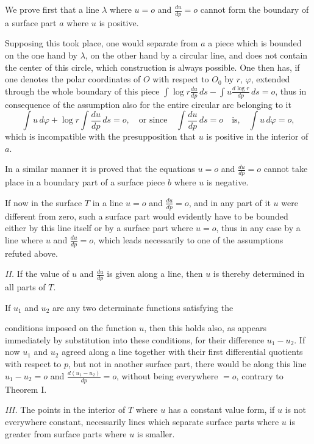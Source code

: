 \documentclass{article}
\begin{document}
We prove first that a line $\lambda$ where $u = o$ and $\frac{du}{dp} = o$ cannot form the boundary of a surface part $a$ where $u$ is positive.

Supposing this took place, one would separate from $a$ a piece which is bounded on the one hand by $\lambda$, on the other hand by a circular line, and does not contain the center of this circle, which construction is always possible. One then has, if one denotes the polar coordinates of $O$ with respect to $O_0$ by $r$, $\varphi$, extended through the whole boundary of this piece $\displaystyle\int \log r\frac{du}{dp}\,ds - \displaystyle\int u\frac{d\log r}{dp}\,ds = o$, thus in consequence of the assumption also for the entire circular arc belonging to it
\[
\int u\,d\varphi + \log r \int \frac{du}{dp}\,ds = o, \quad \text{or since} \quad \int \frac{du}{dp}\,ds = o \quad \text{is,} \quad \int u\,d\varphi = o,
\]
which is incompatible with the presupposition that $u$ is positive in the interior of $a$.

In a similar manner it is proved that the equations $u = o$ and $\frac{du}{dp} = o$ cannot take place in a boundary part of a surface piece $b$ where $u$ is negative.

If now in the surface $T$ in a line $u = o$ and $\frac{du}{dp} = o$, and in any part of it $u$ were different from zero, such a surface part would evidently have to be bounded either by this line itself or by a surface part where $u = o$, thus in any case by a line where $u$ and $\frac{du}{dp} = o$, which leads necessarily to one of the assumptions refuted above.

\emph{II.} If the value of $u$ and $\frac{du}{dp}$ is given along a line, then $u$ is thereby determined in all parts of $T$.

If $u_1$ and $u_2$ are any two determinate functions satisfying the

conditions imposed on the function $u$, then this holds also, as appears immediately by substitution into these conditions, for their difference $u_1 - u_2$. If now $u_1$ and $u_2$ agreed along a line together with their first differential quotients with respect to $p$, but not in another surface part, there would be along this line $u_1 - u_2 = o$ and $\frac{d(u_1 - u_2)}{dp} = o$, without being everywhere $= o$, contrary to Theorem I.

\emph{III.} The points in the interior of $T$ where $u$ has a constant value form, if $u$ is not everywhere constant, necessarily lines which separate surface parts where $u$ is greater from surface parts where $u$ is smaller.
\end{document}
